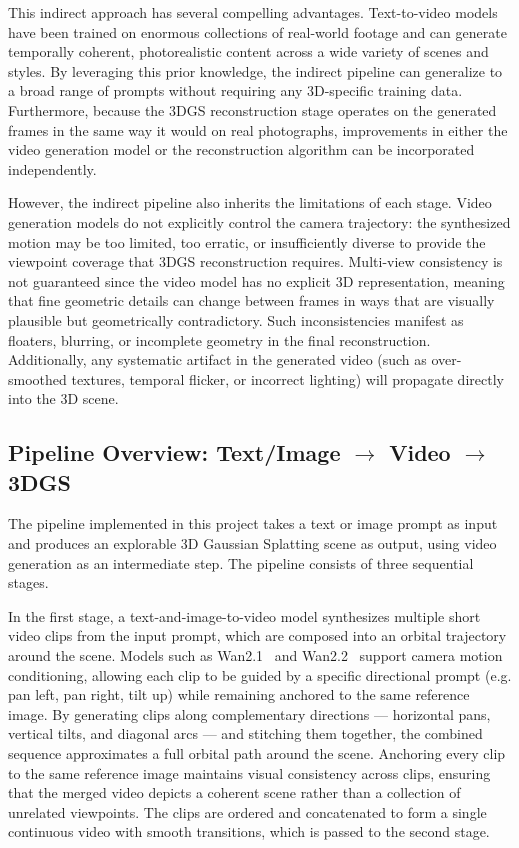 \documentclass[conference]{IEEEtran}
\begin{document}
This indirect approach has several compelling advantages. Text-to-video models have been trained on enormous collections of real-world footage and can generate temporally coherent, photorealistic content across a wide variety of scenes and styles. By leveraging this prior knowledge, the indirect pipeline can generalize to a broad range of prompts without requiring any 3D-specific training data. Furthermore, because the 3DGS reconstruction stage operates on the generated frames in the same way it would on real photographs, improvements in either the video generation model or the reconstruction algorithm can be incorporated independently.

However, the indirect pipeline also inherits the limitations of each stage. Video generation models do not explicitly control the camera trajectory: the synthesized motion may be too limited, too erratic, or insufficiently diverse to provide the viewpoint coverage that 3DGS reconstruction requires. Multi-view consistency is not guaranteed since the video model has no explicit 3D representation, meaning that fine geometric details can change between frames in ways that are visually plausible but geometrically contradictory. Such inconsistencies manifest as floaters, blurring, or incomplete geometry in the final reconstruction. Additionally, any systematic artifact in the generated video (such as over-smoothed textures, temporal flicker, or incorrect lighting) will propagate directly into the 3D scene.

\subsection{Pipeline Overview: Text/Image $\rightarrow$ Video $\rightarrow$ 3DGS}

The pipeline implemented in this project takes a text or image prompt as input and produces an explorable 3D Gaussian Splatting scene as output, using video generation as an intermediate step. The pipeline consists of three sequential stages.

In the first stage, a text-and-image-to-video model synthesizes multiple short video clips from the input prompt, which are composed into an orbital trajectory around the scene. Models such as Wan2.1~\cite{wan_paper} and Wan2.2~\cite{wan_paper} support camera motion conditioning, allowing each clip to be guided by a specific directional prompt (e.g. pan left, pan right, tilt up) while remaining anchored to the same reference image. By generating clips along complementary directions --- horizontal pans, vertical tilts, and diagonal arcs --- and stitching them together, the combined sequence approximates a full orbital path around the scene. Anchoring every clip to the same reference image maintains visual consistency across clips, ensuring that the merged video depicts a coherent scene rather than a collection of unrelated viewpoints. The clips are ordered and concatenated to form a single continuous video with smooth transitions, which is passed to the second stage.
\end{document}
